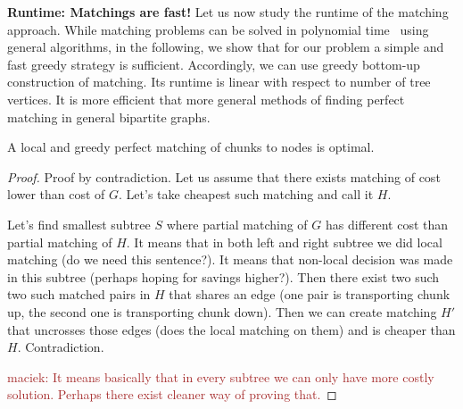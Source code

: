 \documentclass[9pt,twocolumn]{scrartcl}
\newcommand{\maciek}[1]{\textcolor{brown}{maciek: #1}}
\begin{document}
\textbf{Runtime: Matchings are fast!}
Let us now study the runtime of the matching approach.
While matching problems can be solved in polynomial time~\cite{schrijver_combinatorial_optimization} using
general algorithms, in the following, we show that for our problem
a simple and fast greedy strategy is sufficient. 
Accordingly, we can use greedy bottom-up construction of matching. 
Its runtime is linear with respect to number of tree vertices. It is more efficient that more general methods of 
finding perfect matching in general bipartite graphs.


\begin{lemma}
A local and greedy perfect matching of chunks to nodes is optimal. 
\end{lemma}
\begin{proof}
Proof by contradiction. Let us assume that there exists matching of cost lower 
than cost of $G$. Let's take cheapest such matching and call it $H$.

Let's find smallest subtree $S$ where partial matching of $G$ has different cost than partial matching of $H$. It means that in both left and right subtree we did local matching (do we need this sentence?). It means that non-local decision was made in this subtree (perhaps hoping for savings higher?). Then there exist two such two such matched pairs in $H$ that shares an edge (one pair is transporting chunk up, the second one is transporting chunk down). Then we can create matching $H'$ that uncrosses those edges (does the local matching on them) and is cheaper than $H$. Contradiction.

\maciek{It means basically that in every subtree we can only have more costly solution. Perhaps there exist cleaner way of proving that.}
\end{proof}
\end{document}
